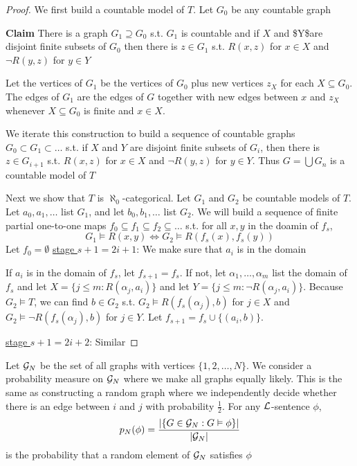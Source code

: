 \documentclass[11pt]{article}
\begin{document}
\begin{proof}
We first build a countable model of \(T\). Let \(G_0\) be any countable graph

\textbf{Claim} There is a graph \(G_1\supseteq G_0\) s.t. \(G_1\) is countable and if
\(X\) and \$Y\$are disjoint finite subsets of \(G_0\) then there is 
\(z\in G_1\) s.t. \(R(x,z)\) for \(x\in X\) and \(\neg R(y,z)\) for \(y\in
    Y\)

Let the vertices of \(G_1\) be the vertices of \(G_0\) plus new vertices
\(z_X\) for each \(X\subseteq G_0\). The edges of \(G_1\) are the edges of
\(G\) together  with new edges between \(x\) and \(z_X\) whenever 
\(X\subseteq G_0\) is finite and \(x\in X\).

We iterate this construction to build a sequence of countable graphs 
\(G_0\subset G_1\subset\dots\) s.t. if \(X\) and \(Y\) are disjoint finite
subsets of \(G_i\), then there is \(z\in G_{i+1}\) s.t. \(R(x,z)\) for
\(x\in X\) and \(\neg R(y,z)\) for \(y\in Y\). Thus \(G=\bigcup G_n\) is a
countable model of \(T\)

Next we show that \(T\) is \(\aleph_0\)-categorical. Let \(G_1\) and \(G_2\)
be countable models of \(T\). Let \(a_0,a_1,\dots\) list \(G_1\), and let
\(b_0,b_1,\dots\) list \(G_2\). We will build a sequence of finite partial
one-to-one maps \(f_0\subseteq f_1\subseteq f_2\subseteq\dots\) s.t. for all
\(x,y\) in the doamin of \(f_s\),
\begin{equation*}
G_1\vDash R(x,y)\Leftrightarrow G_2\vDash R(f_s(x),f_s(y))
\end{equation*}
Let \(f_0=\emptyset\)
\uline{stage \(s+1=2i+1\)}: We make sure that \(a_i\) is in the domain

If \(a_i\) is in the domain of \(f_s\), let \(f_{s+1}=f_s\). If not, let
\(\alpha_1,\dots,\alpha_m\) list the domain of \(f_s\) and let 
\(X=\{j\le m:R(\alpha_j,a_i)\}\) and let \(Y=\{j\le m:\neg
    R(\alpha_j,a_i)\}\). Because 
\(G_2\vDash T\), we can find \(b\in G_2\) s.t. \(G_2\vDash
    R(f_s(\alpha_j),b)\) for \(j\in X\) and 
\(G_2\vDash\neg R(f_s(\alpha_j),b)\) for \(j\in Y\). Let
\(f_{s+1}=f_s\cup\{(a_i,b)\}\). 

\uline{stage \(s+1=2i+2\)}: Similar
\end{proof}

Let \(\mathcal{G}_N\) be the set of all graphs with vertices \(\{1,2,\dots,N\}\).
We consider a probability measure on \(\mathcal{G}_N\) where we make all graphs
equally likely. This is the same as constructing a random graph where we
independently decide whether there is an edge between \(i\) and \(j\) with
probability \(\frac{1}{2}\). For any \(\mathcal{L}\)-sentence \(\phi\),
\begin{equation*}
p_N(\phi)=\frac{\abs{\{G\in\calg_N:G\vDash\phi\}}}{\abs{\calg_N}}
\end{equation*}
is the probability that a random element of \(\mathcal{G}_N\) satisfies \(\phi\)
\end{document}
